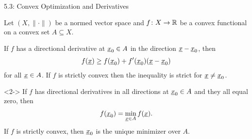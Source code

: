 \documentclass[10pt,english,aspectratio=169]{beamer}
\begin{document}
\begin{frame}{5.3: Convex Optimization and Derivatives}

\begin{minipage}{0.55\textwidth}
Let $(X,\|\cdot\|)$ be a normed vector space and $f \colon X \rightarrow \mathbb{R}$ be a convex functional on a convex set $A \subseteq X$.
\end{minipage}
\begin{minipage}{0.44\textwidth}\hspace{3mm}
\end{minipage}

\begin{theorem}
If $f$ has a directional derivative  at $\underline{x}_0 \in A$ in the direction $\underline{x}-\underline{x}_0$, then \vspace{-1mm}
\[ f(\vecnot{x}) \geq f(\vecnot{x}_0) + f'(\vecnot{x}_0)(\vecnot{x}-\vecnot{x}_0) \vspace{-1mm} \]
for all $\underline{x}\in A$.
If $f$ is strictly convex then the inequality is strict for $\underline{x}\neq \underline{x}_0$.
\end{theorem}

\vspace{1mm}

\begin{corollary}<2->
If $f$ has directional derivatives in all directions at $\underline{x}_0 \in A$ and they all equal zero, then \vspace{-2mm}
\[ f(\vecnot{x}_0) = \min_{\vecnot{x}\in A} f(\vecnot{x}). \vspace{-2mm} \]
If $f$ is strictly convex, then $\underline{x}_0$ is the unique minimizer over $A$.
\end{corollary}


\end{frame}
\end{document}
